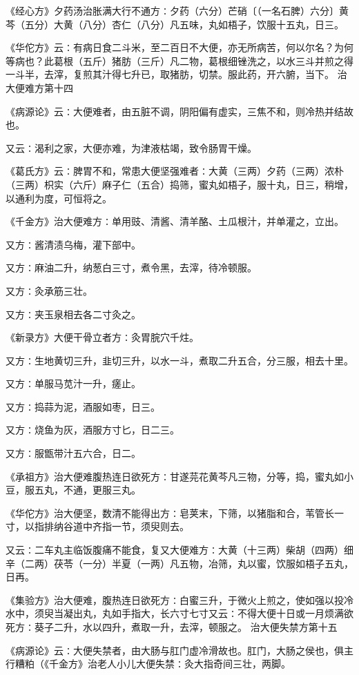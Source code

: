 \documentclass[a4paper,12pt,UTF8,twoside]{ctexbook}
\begin{document}
《经心方》夕药汤治胀满大行不通方∶夕药（六分）芒硝〔（一名石脾）六分〕黄芩（五分）大黄（八分）杏仁（八分）凡五味，丸如梧子，饮服十五丸，日三。

《华佗方》云∶有病日食二斗米，至二百日不大便，亦无所病苦，何以尔名？为何等病也？此葛根（五斤）猪肪（三斤）凡二物，葛根细锉洗之，以水三斗并煎之得一斗半，去滓，复煎其汁得七升已，取猪肪，切禁。服此药，开六腑，当下。
治大便难方第十四

《病源论》云∶大便难者，由五脏不调，阴阳偏有虚实，三焦不和，则冷热并结故也。

又云∶渴利之家，大便亦难，为津液枯竭，致令肠胃干燥。

《葛氏方》云∶脾胃不和，常患大便坚强难者∶大黄（三两）夕药（三两）浓朴（三两）枳实（六斤）麻子仁（五合）捣筛，蜜丸如梧子，服十丸，日三，稍增，以通利为度，可恒将之。

《千金方》治大便难方∶单用豉、清酱、清羊酪、土瓜根汁，并单灌之，立出。

又方∶酱清渍乌梅，灌下部中。

又方∶麻油二升，纳葱白三寸，煮令黑，去滓，待冷顿服。

又方∶灸承筋三壮。

又方∶夹玉泉相去各二寸灸之。

《新录方》大便干骨立者方∶灸胃脘穴千炷。

又方∶生地黄切三升，韭切三升，以水一斗，煮取二升五合，分三服，相去十里。

又方∶单服马苋汁一升，瘥止。

又方∶捣蒜为泥，酒服如枣，日三。

又方∶烧鱼为灰，酒服方寸匕，日二三。

又方∶服甑带汁五六合，日二。

《承祖方》治大便难腹热连日欲死方∶甘遂芫花黄芩凡三物，分等，捣，蜜丸如小豆，服五丸，不通，更服三丸。

《华佗方》治大便坚，数清不能得出方∶皂荚末，下筛，以猪脂和合，苇管长一寸，以指排纳谷道中齐指一节，须臾则去。

又云∶二车丸主临饭腹痛不能食，复又大便难方∶大黄（十三两）柴胡（四两）细辛（二两）茯苓（一分）半夏（一两）凡五物，冶筛，丸以蜜，饮服如梧子五丸，日再。

《集验方》治大便难，腹热连日欲死方∶白蜜三升，于微火上煎之，使如强以投冷水中，须臾当凝出丸，丸如手指大，长六寸七寸又云∶不得大便十日或一月烦满欲死方∶葵子二升，水以四升，煮取一升，去滓，顿服之。
治大便失禁方第十五

《病源论》云∶大便失禁者，由大肠与肛门虚冷滑故也。肛门，大肠之侯也，俱主行糟粕（《千金方》治老人小儿大便失禁∶灸大指奇间三壮，两脚。
\end{document}
